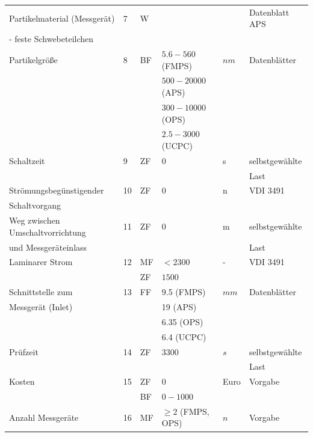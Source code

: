 \begin{longtable}{| l | l | l | l | l | l |}
	\hline
	
	Partikelmaterial (Messger\"{a}t) & 7 & W &  &  & Datenblatt APS\\
	- feste Schwebeteilchen & & & & &\\
	
	\hline
	
	Partikelgr\"{o}{\ss}e & 8 & BF & $5.6-560$ (FMPS) & $nm$ & Datenbl\"{a}tter\\
	& & & $500-20000$ (APS) & &\\
	& & & $300-10000$ (OPS) & &\\
	& & & $2.5-3000$ (UCPC) & &\\
	
	\hline	
		
	Schaltzeit & 9 & ZF & 0 & s & selbstgew\"{a}hlte\\
	& & & & & Last\\
	
	\hline
	
	Str\"{o}mungsbeg\"{u}nstigender & 10 & ZF & 0 & n & VDI 3491\\
	Schaltvorgang & & & & &\\
	
	\hline	
			
	Weg zwischen Umschaltvorrichtung & 11 & ZF & 0 & m & selbstgew\"{a}hlte\\ 
	und Messger\"{a}teinlass & & & & & Last\\
	
	\hline
	
	Laminarer Strom & 12 & MF & $< 2300$ & - & VDI 3491\\
	& & ZF & $1500$ & &\\
	
	\hline
	
	Schnittstelle zum & 13 & FF & 9.5 (FMPS) & $mm$ & Datenbl\"{a}tter\\
	Messger\"{a}t (Inlet) & & & 19 (APS) & &\\
	& & & 6.35 (OPS) & &\\
	& & & 6.4 (UCPC) & &\\
	
	\hline		
		
	Pr\"{u}fzeit & 14 & ZF & 3300 & $s$ & selbstgew\"{a}hlte\\
	& & & & & Last\\
	
	\hline
	
	Kosten & 15 & ZF & 0 & Euro & Vorgabe \\
	& & BF & $0-1000$ & &\\
	
	\hline
	
	Anzahl Messger\"{a}te& 16 & MF & $\geq2$ (FMPS, OPS) & $n$ & Vorgabe\\
	
	\hline
\end{longtable}

